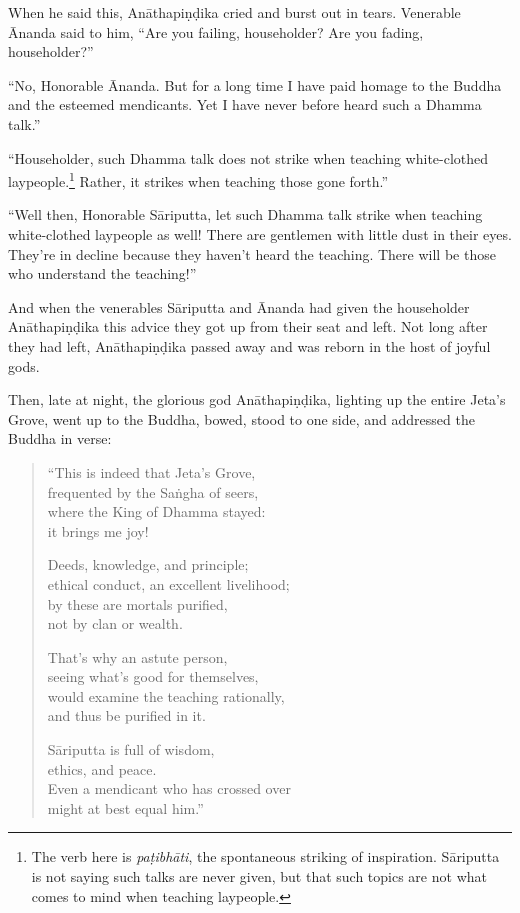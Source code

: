 \documentclass[12pt,openany]{book}%
\begin{document}
When he said this, \textsanskrit{Anāthapiṇḍika} cried and burst out in tears. Venerable Ānanda said to him, “Are you failing, householder? Are you fading, householder?” 

“No, Honorable Ānanda. But for a long time I have paid homage to the Buddha and the esteemed mendicants. Yet I have never before heard such a Dhamma talk.” 

“Householder, such Dhamma talk does not strike when teaching white-clothed laypeople.\footnote{The verb here is \textit{\textsanskrit{paṭibhāti}}, the spontaneous striking of inspiration. \textsanskrit{Sāriputta} is not saying such talks are never given, but that such topics are not what comes to mind when teaching laypeople. } Rather, it strikes when teaching those gone forth.” 

“Well then, Honorable \textsanskrit{Sāriputta}, let such Dhamma talk strike when teaching white-clothed laypeople as well! There are gentlemen with little dust in their eyes. They’re in decline because they haven’t heard the teaching. There will be those who understand the teaching!” 

And when the venerables \textsanskrit{Sāriputta} and Ānanda had given the householder \textsanskrit{Anāthapiṇḍika} this advice they got up from their seat and left. Not long after they had left, \textsanskrit{Anāthapiṇḍika} passed away and was reborn in the host of joyful gods. 

Then, late at night, the glorious god \textsanskrit{Anāthapiṇḍika}, lighting up the entire Jeta’s Grove, went up to the Buddha, bowed, stood to one side, and addressed the Buddha in verse: 

\begin{verse}%
“This is indeed that Jeta’s Grove, \\
frequented by the \textsanskrit{Saṅgha} of seers, \\
where the King of Dhamma stayed: \\
it brings me joy! 

Deeds, knowledge, and principle; \\
ethical conduct, an excellent livelihood; \\
by these are mortals purified, \\
not by clan or wealth. 

That’s why an astute person, \\
seeing what’s good for themselves, \\
would examine the teaching rationally, \\
and thus be purified in it. 

\textsanskrit{Sāriputta} is full of wisdom, \\
ethics, and peace. \\
Even a mendicant who has crossed over \\
might at best equal him.” 

%
\end{verse}
\end{document}
